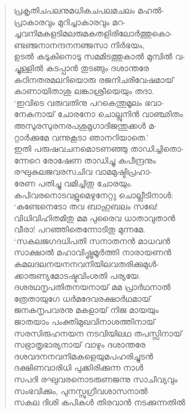 \begin{verse}
പ്രകൃതിചപലനുമധികചപലമചലം മഹല്‍-\\
പ്രാകാരവും മുറിച്ചാകാരവും മറ-\\
ച്ചവനിമകളടിമലരുമകതളിരിലോര്‍ത്തുകൊ-\\
ണ്ടഞ്ജനാനന്ദനനഞ്ജസാ നിര്‍ഭയം,\\
ഉടല്‍ കടുകിനൊടു സമമിടത്തുകാല്‍ മുമ്പില്‍ വ-\\
ച്ചുള്ളില്‍ കടപ്പാന്‍ തുടങ്ങും ദശാന്തരേ\\
കഠിനതരമലറിയൊരു രജനിചരിവേഷമായ്\\
കാണായിതാശു ലങ്കാശ്രീയെയും തദാ.\\
‘ഇവിടെ വരുവതിനു പറകെന്തുമൂലം ഭവാ-\\
നേകനായ് ചോരനോ ചൊല്ലുനിന്‍ വാഞ്ഛിതം\\
അസുരസുരനരപശുമൃഗാദിജന്തുക്കള്‍ മ-\\
റ്റാര്‍ക്കുമേ വന്നുകൂടാ ഞാനറിയാതെ.’\\
ഇതി പരുഷവചനമൊടണഞ്ഞു താഡിച്ചിതൊ-\\
ന്നേറെ രോഷേണ താഡിച്ചു കപീന്ദ്രനും\\
രഘുകുലജവരസചിവ വാമമുഷ്ടിപ്രഹാ-\\
രേണ പതിച്ചു വമിച്ചിതു ചോരയും.\\
കപിവരനൊടവളുമെഴുനേറ്റു ചൊല്ലീടിനാള്‍:\\
‘കണ്ടേനെടോ തവ ബാഹുബലം സഖേ!\\
വിധിവിഹിതമിതു മമ പുരൈവ ധാതാവുതാന്‍\\
വീരാ! പറഞ്ഞിതെന്നോടിതു മുന്നമേ.\\
‘സകലജഗദധിപതി സനാതനന്‍ മാധവന്‍\\
സാക്ഷാല്‍ മഹാവിഷ്ണുമൂര്‍ത്തി നാരായണന്‍\\
കമലദലനയനനവനിയിലവതരിക്കുമുള്‍-\\
ക്കാരുണ്യമോടഷ്ടവിംശതി പര്യയേ.\\
ദശരഥനൃപതിതനയനായ് മമ പ്രാര്‍ഥനാല്‍\\
ത്രേതായുഗേ ധര്‍മദേവരക്ഷാര്‍ഥമായ്\\
ജനകനൃപവരനു മകളായ് നിജ മായയും\\
ജാതയാം പംക്തിമുഖവിനാശത്തിനായ്\\
സരസിരുഹനയന നടവിയിലഥ തപസ്സിനായ്\\
സഭ്രാതൃഭാര്യനായ് വാഴും ദശാന്തരേ\\
ദശവദനനവനിമകളെയുമപഹരിച്ചുടന്‍\\
ദക്ഷിണവാരിധി പുക്കിരിക്കുന്ന നാള്‍\\
സപദി രഘുവരനൊടരുണജന്നു സാചിവ്യവും\\
സംഭവിക്കും, പുനസ്സുഗ്രീവശാസനാല്‍\\
സകല ദിശി കപികള്‍ തിരവാന്‍ നടക്കുന്നതില്‍\\

\end{verse}
